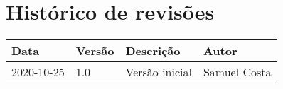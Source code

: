 \section*{Histórico de revisões}

\begin{table}[H]
	\begin{tabular}{|l|l|l|l|}
		\hline
		\textbf{Data} & \textbf{Versão} & \textbf{Descrição} & \textbf{Autor} \\ \hline
		2020-10-25    & 1.0             & Versão inicial     & Samuel Costa   \\ \hline
	\end{tabular}
\end{table}

\clearpage